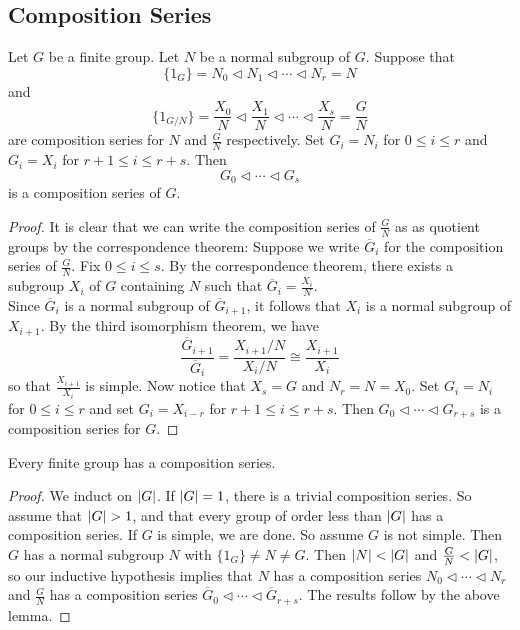 \documentclass[a4paper]{article}
\begin{document}
\subsection{Composition Series}
\begin{lmm}{}{} Let $G$ be a finite group. Let $N$ be a normal subgroup of $G$. Suppose that $$\{1_G\}=N_0\triangleleft N_1\triangleleft\cdots\triangleleft N_r=N$$ and $$\{1_{G/N}\}=\frac{X_0}{N}\triangleleft\frac{X_1}{N}\triangleleft\cdots\triangleleft\frac{X_s}{N}=\frac{G}{N}$$ are composition series for $N$ and $\frac{G}{N}$ respectively. Set $G_i=N_i$ for $0\leq i\leq r$ and $G_i=X_i$ for $r+1\leq i\leq r+s$. Then $$G_0\triangleleft\cdots\triangleleft G_s$$ is a composition series of $G$. 
\begin{proof}
It is clear that we can write the composition series of $\frac{G}{N}$ as as quotient groups by the correspondence theorem: Suppose we write $\overline{G}_i$ for the composition series of $\frac{G}{N}$. Fix $0\leq i\leq s$. By the correspondence theorem, there exists a subgroup $X_i$ of $G$ containing $N$ such that $\overline{G}_i=\frac{X_i}{N}$. \\

Since $\overline{G}_i$ is a normal subgroup of $\overline{G}_{i+1}$, it follows that $X_i$ is a normal subgroup of $X_{i+1}$. By the third isomorphism theorem, we have $$\frac{\overline{G}_{i+1}}{\overline{G}_i}=\frac{X_{i+1}/N}{X_i/N}\cong\frac{X_{i+1}}{X_i}$$ so that $\frac{X_{i+1}}{X_i}$ is simple. Now notice that $X_s=G$ and $N_r=N=X_0$. Set $G_i=N_i$ for $0\leq i\leq r$ and set $G_i=X_{i-r}$ for $r+1\leq i\leq r+s$. Then $G_0\triangleleft\cdots\triangleleft G_{r+s}$ is a composition series for $G$.
\end{proof}
\end{lmm}


\begin{prp}{}{} Every finite group has a composition series. 
\begin{proof}
We induct on $\abs{G}$. If $\abs{G}=1$, there is a trivial composition series. So assume that $\abs{G}>1$, and that every group of order less than $\abs{G}$ has a composition series. If $G$ is simple, we are done. So assume $G$ is not simple. Then $G$ has a normal subgroup $N$ with $\{1_G\}\neq N\neq G$. Then $\abs{N}<\abs{G}$ and $\frac{G}{N}<\abs{G}$, so our inductive hypothesis implies that $N$ has a composition series $N_0\triangleleft\cdots\triangleleft N_r$ and $\frac{G}{N}$ has a composition series $\overline{G}_0\triangleleft\cdots\triangleleft\overline{G}_{r+s}$. The results follow by the above lemma. 
\end{proof}
\end{prp}
\end{document}
